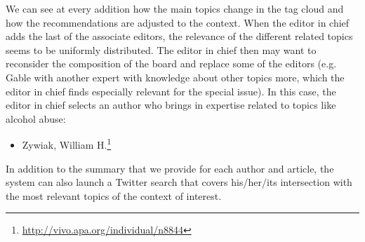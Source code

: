 We can see at every addition how the main topics change in the tag cloud and how
the recommendations are adjusted to the context. When the editor in chief adds
the last of the associate editors, the relevance of the different related topics
seems to be uniformly distributed. The editor in chief then may want to
reconsider the composition of the board and replace some of the editors (e.g.
Gable with another expert with knowledge about other topics more, which the
editor in chief finds especially relevant for the special issue).  In this case,
the editor in chief selects an author who brings in expertise related to topics
like alcohol abuse:
\begin{itemize}
  \item Zywiak, William H.\footnote{\url{http://vivo.apa.org/individual/n8844}}
\end{itemize}
In addition to the summary that we provide for each author and article, the
system can also launch a Twitter search that covers his/her/its intersection
with the most relevant topics of the context of interest.

